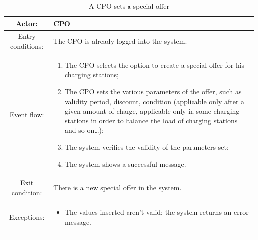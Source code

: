 \begin{table}[h]
    \begin{center}
        \begin{tabular}{|c||p{10cm}|}
            \hline
            Actor:            & \ac{CPO}                                                     \\
            \hline
            Entry conditions: & The \ac{CPO} is already logged into the system.              \\
            \hline
            Event flow:       &
            \begin{enumerate}
                \item The \ac{CPO} selects the option to create a special offer for his charging stations;
                \item The \ac{CPO} sets the various parameters of the offer, such as validity period, discount, condition (applicable only after a given amount of charge, applicable only in some charging stations in order to balance the load of charging stations and so on\dots);
                \item The system verifies the validity of the parameters set;
                \item The system shows a successful message.
            \end{enumerate}
            \\
            \hline
            Exit condition:   & There is a new special offer in the system. \\
            \hline
            Exceptions:       &
            \begin{itemize}
                \item The values inserted aren't valid: the system returns an error message.
            \end{itemize}
            \\
            \hline
        \end{tabular}
    \end{center}
    \caption{A \ac{CPO} sets a special offer}
\end{table}

